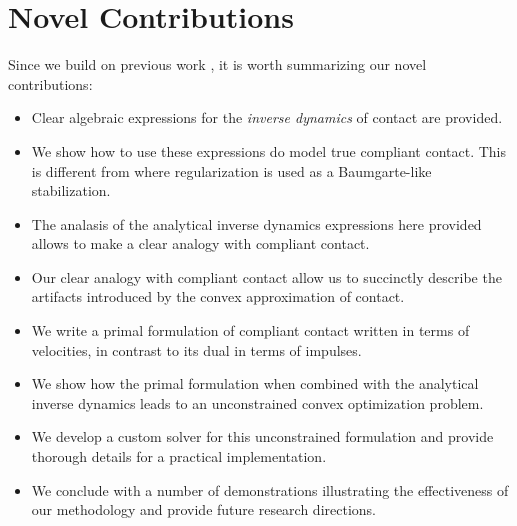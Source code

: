 \section{Novel Contributions}

Since we build on previous work \cite{bib:anitescu2006,
bib:anitescu2010,bib:todorov2014}, it is worth summarizing our novel
contributions:
\begin{itemize}
	\item Clear algebraic expressions for the \textit{inverse dynamics} of
	contact are provided.
	\item We show how to use these expressions do model true compliant contact.
	This is different from \cite{bib:todorov2014} where regularization is used
	as a Baumgarte-like stabilization.
	\item The analasis of the analytical inverse dynamics expressions here
	provided allows to make a clear analogy with compliant contact.
	\item Our clear analogy with compliant contact allow us to succinctly
	describe the artifacts introduced by the convex approximation of contact.
	\item We write a primal formulation of compliant contact written in terms of
	velocities, in contrast to its dual in terms of impulses.
	\item We show how the primal formulation when combined with the analytical
	 inverse dynamics leads to an unconstrained convex optimization problem.
	\item We develop a custom solver for this unconstrained formulation and
	provide thorough details for a practical implementation.
	\item We conclude with a number of demonstrations illustrating the
	effectiveness of our methodology and provide future research directions.
\end{itemize}
